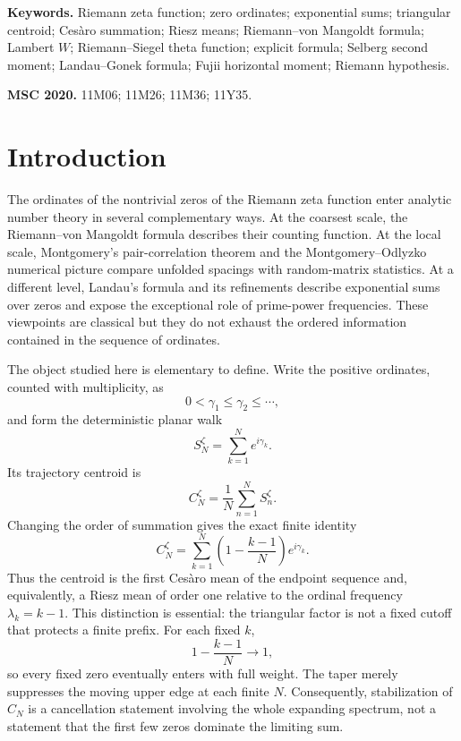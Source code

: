 \documentclass[11pt]{amsart}
\numberwithin{equation}{section}
\theoremstyle{definition}
\theoremstyle{remark}
\begin{document}
\maketitle

\noindent\textbf{Keywords.} Riemann zeta function; zero ordinates; exponential sums; triangular centroid; Cesàro summation; Riesz means; Riemann--von Mangoldt formula; Lambert $W$; Riemann--Siegel theta function; explicit formula; Selberg second moment; Landau--Gonek formula; Fujii horizontal moment; Riemann hypothesis.

\medskip
\noindent\textbf{MSC 2020.} 11M06; 11M26; 11M36; 11Y35.

\tableofcontents
\newpage

\section{Introduction}\label{sec:introduction}

The ordinates of the nontrivial zeros of the Riemann zeta function enter analytic number theory in several complementary ways.  At the coarsest scale, the Riemann--von Mangoldt formula describes their counting function.  At the local scale, Montgomery's pair-correlation theorem and the Montgomery--Odlyzko numerical picture compare unfolded spacings with random-matrix statistics.  At a different level, Landau's formula and its refinements describe exponential sums over zeros and expose the exceptional role of prime-power frequencies.  These viewpoints are classical but they do not exhaust the ordered information contained in the sequence of ordinates.

The object studied here is elementary to define.  Write the positive ordinates, counted with multiplicity, as
\[
0<\gamma_1\leq\gamma_2\leq\cdots,
\]
and form the deterministic planar walk
\[
S_N^{\zeta}=\sum_{k=1}^N e^{i\gamma_k}.
\]
Its trajectory centroid is
\[
C_N^{\zeta}=\frac1N\sum_{n=1}^N S_n^{\zeta}.
\]
Changing the order of summation gives the exact finite identity
\[
C_N^{\zeta}
=\sum_{k=1}^{N}\left(1-\frac{k-1}{N}\right)e^{i\gamma_k}.
\]
Thus the centroid is the first Cesàro mean of the endpoint sequence and, equivalently, a Riesz mean of order one relative to the ordinal frequency $\lambda_k=k-1$.  This distinction is essential: the triangular factor is not a fixed cutoff that protects a finite prefix.  For each fixed $k$,
\[
1-\frac{k-1}{N}\longrightarrow1,
\]
so every fixed zero eventually enters with full weight.  The taper merely suppresses the moving upper edge at each finite $N$.  Consequently, stabilization of $C_N$ is a cancellation statement involving the whole expanding spectrum, not a statement that the first few zeros dominate the limiting sum.
\end{document}
